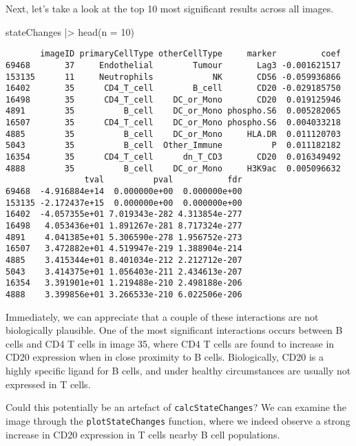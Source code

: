 \documentclass[
  letterpaper,
  DIV=11,
  numbers=noendperiod]{scrreprt}
\newenvironment{Shaded}{\begin{snugshade}}{\end{snugshade}}
\newcommand{\AttributeTok}[1]{\textcolor[rgb]{0.40,0.45,0.13}{#1}}
\newcommand{\DecValTok}[1]{\textcolor[rgb]{0.68,0.00,0.00}{#1}}
\newcommand{\FunctionTok}[1]{\textcolor[rgb]{0.28,0.35,0.67}{#1}}
\newcommand{\NormalTok}[1]{\textcolor[rgb]{0.00,0.23,0.31}{#1}}
\newcommand{\SpecialCharTok}[1]{\textcolor[rgb]{0.37,0.37,0.37}{#1}}
\begin{document}
Next, let's take a look at the top 10 most significant results across
all images.

\begin{Shaded}
\begin{Highlighting}[]
\NormalTok{stateChanges }\SpecialCharTok{|\textgreater{}} \FunctionTok{head}\NormalTok{(}\AttributeTok{n =} \DecValTok{10}\NormalTok{)}
\end{Highlighting}
\end{Shaded}

\begin{verbatim}
       imageID primaryCellType otherCellType     marker         coef
69468       37     Endothelial        Tumour       Lag3 -0.001621517
153135      11     Neutrophils            NK       CD56 -0.059936866
16402       35      CD4_T_cell        B_cell       CD20 -0.029185750
16498       35      CD4_T_cell    DC_or_Mono       CD20  0.019125946
4891        35          B_cell    DC_or_Mono phospho.S6  0.005282065
16507       35      CD4_T_cell    DC_or_Mono phospho.S6  0.004033218
4885        35          B_cell    DC_or_Mono     HLA.DR  0.011120703
5043        35          B_cell  Other_Immune          P  0.011182182
16354       35      CD4_T_cell      dn_T_CD3       CD20  0.016349492
4888        35          B_cell    DC_or_Mono     H3K9ac  0.005096632
                tval          pval           fdr
69468  -4.916884e+14  0.000000e+00  0.000000e+00
153135 -2.172437e+15  0.000000e+00  0.000000e+00
16402  -4.057355e+01 7.019343e-282 4.313854e-277
16498   4.053436e+01 1.891267e-281 8.717324e-277
4891    4.041385e+01 5.306590e-278 1.956752e-273
16507   3.472882e+01 4.519947e-219 1.388904e-214
4885    3.415344e+01 8.401034e-212 2.212712e-207
5043    3.414375e+01 1.056403e-211 2.434613e-207
16354   3.391901e+01 1.219488e-210 2.498188e-206
4888    3.399856e+01 3.266533e-210 6.022506e-206
\end{verbatim}

Immediately, we can appreciate that a couple of these interactions are
not biologically plausible. One of the most significant interactions
occurs between B cells and CD4 T cells in image 35, where CD4 T cells
are found to increase in CD20 expression when in close proximity to B
cells. Biologically, CD20 is a highly specific ligand for B cells, and
under healthy circumstances are usually not expressed in T cells.

Could this potentially be an artefact of \texttt{calcStateChanges}? We
can examine the image through the \texttt{plotStateChanges} function,
where we indeed observe a strong increase in CD20 expression in T cells
nearby B cell populations.
\end{document}

